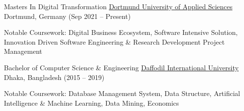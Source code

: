 \documentclass[]{awesome-cv}
\begin{document}
\begin{cventries}
	\cventry
	{Masters In Digital Transformation}
	{\href{https://www.fh-dortmund.de/en/programs/digital-transformation-master.php}{Dortmund University of Applied Sciences}}
	{}
	{Dortmund, Germany (Sep 2021 – Present)}
	{\begin{cvitems}
	    \item Notable Coursework: Digital Business Ecosystem, Software Intensive Solution, Innovation Driven Software Engineering \& Research Development Project Management
	\end{cvitems}}
	
	\cventry
	{Bachelor of Computer Science \& Engineering}
	{\href{https://www.fh-dortmund.de/en/programs/digital-transformation-master.php}{Daffodil International University}}
	{}
	{Dhaka, Bangladesh (2015 –  2019)}
	{\begin{cvitems}
	    \item Notable Coursework: Database Management System, Data Structure, Artificial Intelligence \& Machine Learning, Data Mining, Economics
	\end{cvitems}}
\end{cventries}
\end{document}

